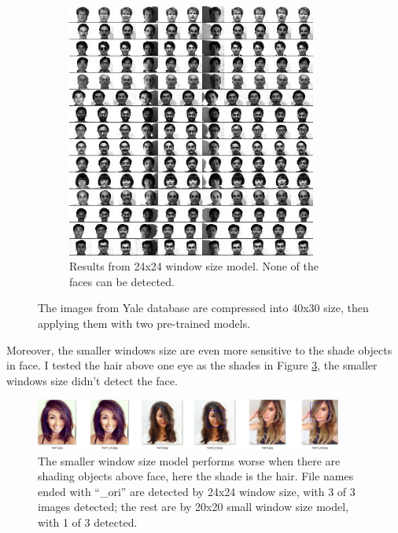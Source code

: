 \documentclass[10pt,twocolumn,letterpaper]{article}
\begin{document}
\begin{figure}[t]
\begin{subfigure}[t]{0.45\textwidth}
\begin{center}
            \includegraphics[width=0.9\textwidth]{yaleallsmall_ori}
        \end{center}
        \caption{Results from 24x24 window size model. None of the faces can be detected.}
        \label{fig:yori}
    \end{subfigure}
    \caption{The images from Yale database are compressed into 40x30 size, then applying them with two pre-trained models.}
\end{figure}

Moreover, the smaller windows size are even more sensitive to the shade objects in face.
I tested the hair above one eye as the shades in Figure \ref{fig:hair}, the smaller windows size didn't detect the face.

\begin{figure}
    \begin{center}
        \includegraphics[width=0.9\textwidth]{hairstyle}
    \end{center}
    \caption{The smaller window size model performs worse when there are shading objects above face, here the shade is the hair.
    File names ended with ``\_ori'' are detected by 24x24 window size, with 3 of 3 images detected; the rest are by 20x20 small window size model, with 1 of 3 detected.}
    \label{fig:hair}
\end{figure}
\end{document}
